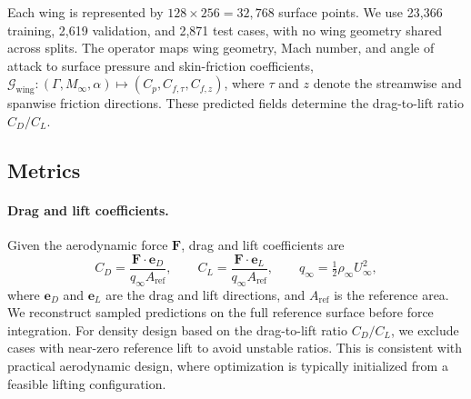 \documentclass{article}
\begin{document}
Each wing is represented by $128\times256=32{,}768$ surface points. We use 23,366 training, 2,619 validation, and 2,871 test cases, with no wing geometry shared across splits. The operator maps wing geometry, Mach number, and angle of attack to surface pressure and skin-friction coefficients, $\mathcal{G}_{\mathrm{wing}}:(\Gamma,M_\infty,\alpha)\mapsto(C_p,C_{f,\tau},C_{f,z})$, where $\tau$ and $z$ denote the streamwise and spanwise friction directions. These predicted fields determine the drag-to-lift ratio $C_D/C_L$.

\subsection{Metrics}
\label{app:metrics}

\paragraph{Drag and lift coefficients.}
Given the aerodynamic force $\mathbf{F}$, drag and lift coefficients are
\begin{equation}
    C_D=\frac{\mathbf{F}\!\cdot\mathbf{e}_D}{q_\infty A_{\mathrm{ref}}},
    \qquad
    C_L=\frac{\mathbf{F}\!\cdot\mathbf{e}_L}{q_\infty A_{\mathrm{ref}}},
    \qquad
    q_\infty=\tfrac12\rho_\infty U_\infty^2,
    \label{eq:app_aerodynamic_coefficients}
\end{equation}
where $\mathbf{e}_D$ and $\mathbf{e}_L$ are the drag and lift directions, and $A_{\mathrm{ref}}$ is the reference area. We reconstruct sampled predictions on the full reference surface before force integration. For density design based on the drag-to-lift ratio \(C_D/C_L\), we exclude cases with near-zero reference lift to avoid unstable ratios. This is consistent with practical aerodynamic design, where optimization is typically initialized from a feasible lifting configuration.
\end{document}
